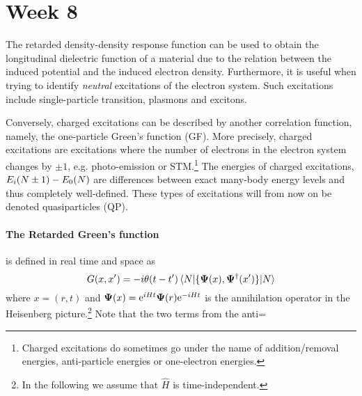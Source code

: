 \section{Week 8}
The retarded density-density response function can be used to obtain the longitudinal dielectric function of a material due to the relation between the induced potential and the induced electron density. Furthermore, it is useful when trying to identify \textit{neutral} excitations of the electron system. Such excitations include single-particle transition, plasmons and excitons. 

Conversely, charged excitations can be described by another correlation function, namely, the one-particle Green's function (GF). More precisely, charged excitations are excitations where the number of electrons in the electron system changes by $\pm 1$, e.g. photo-emission or STM.\footnote{Charged excitations do sometimes go under the name of addition/removal energies, anti-particle energies or one-electron energies.} 
The energies of charged excitations, $E_i \qty(N\pm1) - E_0\qty(N)$ are differences between exact many-body energy levels and thus completely well-defined. These types of excitations will from now on be denoted quasiparticles (QP).

\paragraph{The Retarded Green's function} is defined in real time and space as
\begin{equation}
    G\qty(x,x') = -i \theta\qty(t-t') \mel{N}{\{\boldsymbol{\Psi}\qty(x),\boldsymbol{\Psi}^{\dagger}\qty(x')\}}{N}
\end{equation}
where $x = (r,t)$ and $\boldsymbol{\Psi}\qty(x)=\mathrm{e}^{{iHt}}\boldsymbol{\Psi}\qty(r) \mathrm{e}^{{-iHt}}$ is the annihilation operator in the Heisenberg picture.\footnote{In the following we assume that $\hat{H}$ is time-independent.}
Note that the two terms from the anti=